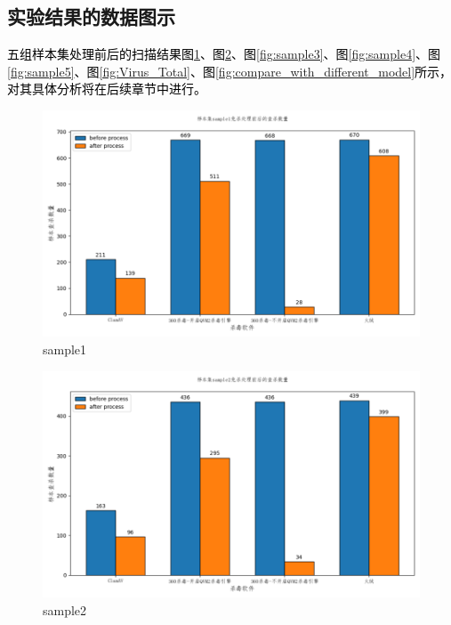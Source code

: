 \subsection{实验结果的数据图示}

\textcolor{black}{五组样本集处理前后的扫描结果图\ref{fig:sample1}、图\ref{fig:sample2}、图\ref{fig:sample3}、图\ref{fig:sample4}、图\ref{fig:sample5}、图\ref{fig:Virus_Total}、图\ref{fig:compare_with_different_model}所示，对其具体分析将在后续章节中进行。}

\begin{figure}
  \centering
  \includegraphics[]{images/sample1.png}
  \caption{sample1}\label{fig:sample1}
\end{figure}

\begin{figure}
  \centering
  \includegraphics[]{images/sample2.png}
  \caption{sample2}\label{fig:sample2}
\end{figure}

